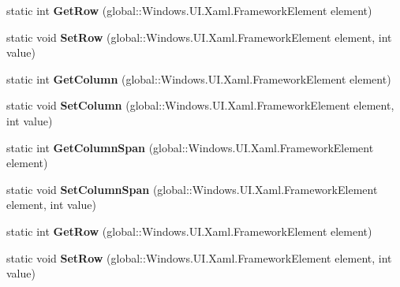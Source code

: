 \begin{DoxyCompactItemize}
static int {\bfseries Get\+Row} (global\+::\+Windows.\+U\+I.\+Xaml.\+Framework\+Element element)
\item 
\mbox{\label{class_windows_1_1_u_i_1_1_xaml_1_1_controls_1_1_grid_a2d87af7c083d5c02d5eb9d3079e6c84f}} 
static void {\bfseries Set\+Row} (global\+::\+Windows.\+U\+I.\+Xaml.\+Framework\+Element element, int value)
\item 
\mbox{\label{class_windows_1_1_u_i_1_1_xaml_1_1_controls_1_1_grid_adeabc44596ae45474187e91cc83b4053}} 
static int {\bfseries Get\+Column} (global\+::\+Windows.\+U\+I.\+Xaml.\+Framework\+Element element)
\item 
\mbox{\label{class_windows_1_1_u_i_1_1_xaml_1_1_controls_1_1_grid_ad85395750dd3aafd10cf1aa7214b4051}} 
static void {\bfseries Set\+Column} (global\+::\+Windows.\+U\+I.\+Xaml.\+Framework\+Element element, int value)
\item 
\mbox{\label{class_windows_1_1_u_i_1_1_xaml_1_1_controls_1_1_grid_a166c94be72db2ad46f7ced5642ff2bb1}} 
static int {\bfseries Get\+Column\+Span} (global\+::\+Windows.\+U\+I.\+Xaml.\+Framework\+Element element)
\item 
\mbox{\label{class_windows_1_1_u_i_1_1_xaml_1_1_controls_1_1_grid_afb75a6ca2719689f16cf68ede010bdb2}} 
static void {\bfseries Set\+Column\+Span} (global\+::\+Windows.\+U\+I.\+Xaml.\+Framework\+Element element, int value)
\item 
\mbox{\label{class_windows_1_1_u_i_1_1_xaml_1_1_controls_1_1_grid_a0cf3a18d57c7a539b00d9d58910fc197}} 
static int {\bfseries Get\+Row} (global\+::\+Windows.\+U\+I.\+Xaml.\+Framework\+Element element)
\item 
\mbox{\label{class_windows_1_1_u_i_1_1_xaml_1_1_controls_1_1_grid_a2d87af7c083d5c02d5eb9d3079e6c84f}} 
static void {\bfseries Set\+Row} (global\+::\+Windows.\+U\+I.\+Xaml.\+Framework\+Element element, int value)
\item 

\end{DoxyCompactItemize}
